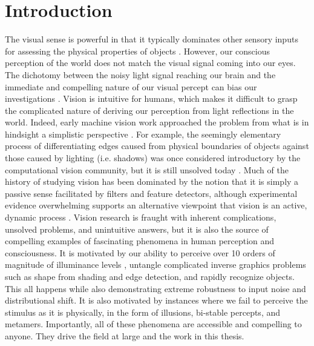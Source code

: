 \chapter{Introduction}\label{ch:intro}
The visual sense is powerful in that it typically dominates other sensory inputs for assessing the physical properties of objects \parencite{ernst2002humans}. However, our conscious perception of the world does not match the visual signal coming into our eyes. The dichotomy between the noisy light signal reaching our brain and the immediate and compelling nature of our visual percept can bias our investigations \parencite{rodieck1998first}. Vision is intuitive for humans, which makes it difficult to grasp the complicated nature of deriving our perception from light reflections in the world. Indeed, early machine vision work approached the problem from what is in hindsight a simplistic perspective \parencite{papert1966summer}. For example, the seemingly elementary process of differentiating edges caused from physical boundaries of objects against those caused by lighting (i.e. shadows) was once considered introductory by the computational vision community, but it is still unsolved today \parencite{adelson2000lightness, barron2012shape}. Much of the history of studying vision has been dominated by the notion that it is simply a passive sense facilitated by filters and feature detectors, although experimental evidence overwhelming supports an alternative viewpoint that vision is an active, dynamic process \parencite{olshausen201320}. Vision research is fraught with inherent complications, unsolved problems, and unintuitive answers, but it is also the source of compelling examples of fascinating phenomena in human perception and consciousness. It is motivated by our ability to perceive over 10 orders of magnitude of illuminance levels \parencite{norton2002psychophysical}, untangle complicated inverse graphics problems such as shape from shading and edge detection, and rapidly recognize objects. This all happens while also demonstrating extreme robustness to input noise and distributional shift. It is also motivated by instances where we fail to perceive the stimulus as it is physically, in the form of illusions, bi-stable percepts, and metamers. Importantly, all of these phenomena are accessible and compelling to anyone. They drive the field at large and the work in this thesis.

